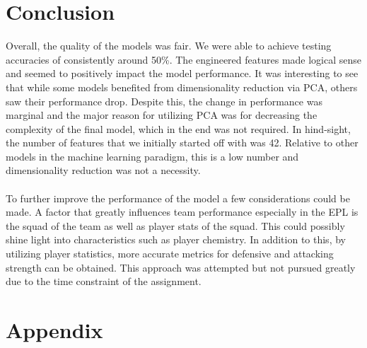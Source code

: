 \documentclass[a4paper,12pt]{article}
\begin{document}
	\section{Conclusion}
	
	Overall, the quality of the models was fair. We were able to achieve testing accuracies of consistently around 50\%. The engineered features made logical sense and seemed to positively impact the model performance. It was interesting to see that while some models benefited from dimensionality reduction via PCA, others saw their performance drop. Despite this, the change in performance was marginal and the major reason for utilizing PCA was for decreasing the complexity of the final model, which in the end was not required. In hind-sight, the number of features that we initially started off with was 42. Relative to other models in the machine learning paradigm, this is a low number and dimensionality reduction was not a necessity. \\
	\\
	To further improve the performance of the model a few considerations could be made. A factor that greatly influences team performance especially in the EPL is the squad of the team as well as player stats of the squad. This could possibly shine light into characteristics such as player chemistry. In addition to this, by utilizing player statistics, more accurate metrics for defensive and attacking strength can be obtained. This approach was attempted but not pursued greatly due to the time constraint of the assignment.
	
	\newpage
	
	\section*{Appendix}
	
\end{document}

